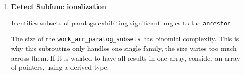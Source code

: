 \begin{enumerate}
\begin{itemize}
            \item \lstinline!active_mask integer(int32), dimension(n_mask_chunks)!: working array to hold the extended subsets
            \item \lstinline!temp_paralog_vector real(real64), dimension(n_dims)!: vector used for pruning subsets
            \item \lstinline!ierr integer(int32)!: error code
            \item \lstinline!max_angle real(real64), optional!: in dosage mode maximum angle in radians \(0 \le angle \le \pi\) that a subset candidate must not exceed, otherwise pruned, default is \(\pi\)
            \item \lstinline!gain_gamma real(real64), optional!: positive magnitude gain for dosage effect, default 0.1
        \end{itemize}

\begin{lstlisting}[caption={Dosage Effect Detection}]
call detect_dosage_effect(ancestor, genes, n_genes, n_dims, filtered_paralogs_mask, n_mask_chunks, &
                          n_results, max_subset_size, work_arr_paralog_subsets, n_paralog_subsets, &
                          active_mask, temp_paralog_vector, ierr, max_angle, gain_gamma)
\end{lstlisting}


    \item \textbf{Detect Subfunctionalization}

        Identifies subsets of paralogs exhibiting significant angles to the \lstinline!ancestor!.

        The size of the \lstinline!work_arr_paralog_subsets! has binomial complexity. This is why this subroutine only handles one single family, the size varies too much across them. If it is wanted to have all results in one array, consider an array of pointers, using a derived type.


\end{enumerate}
